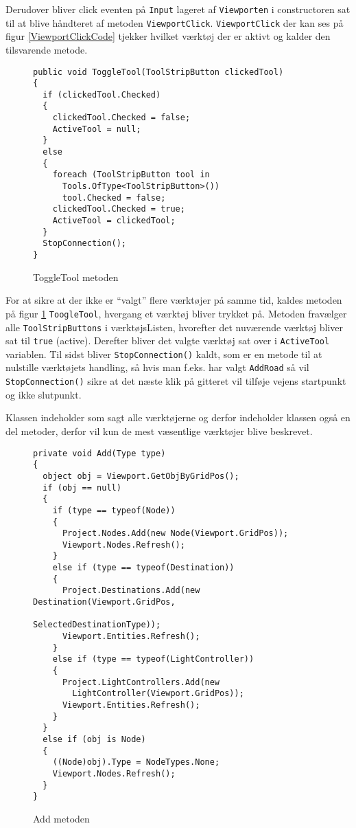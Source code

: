 Derudover bliver click eventen på \texttt{Input} lageret af \texttt{Viewporten} i constructoren sat til at blive håndteret af metoden \texttt{ViewportClick}. \texttt{ViewportClick} der kan ses på figur \ref{ViewportClickCode} tjekker hvilket værktøj der er aktivt og kalder den tilsvarende metode.

\begin{figure}[H]
\begin{lstlisting}
public void ToggleTool(ToolStripButton clickedTool)
{
  if (clickedTool.Checked)
  {
    clickedTool.Checked = false;
    ActiveTool = null;
  }
  else
  {
    foreach (ToolStripButton tool in 
      Tools.OfType<ToolStripButton>())
      tool.Checked = false;
    clickedTool.Checked = true;
    ActiveTool = clickedTool;
  }
  StopConnection();
}
\end{lstlisting}
\caption{ToggleTool metoden}\label{ToggleToolCode}
\end{figure}

For at sikre at der ikke er “valgt” flere værktøjer på samme tid, kaldes metoden på figur \ref{ToggleToolCode} \texttt{ToogleTool}, hvergang et værktøj bliver trykket på. Metoden fravælger alle \texttt{ToolStripButtons} i værktøjsListen, hvorefter det nuværende værktøj bliver sat til \texttt{true} (active). Derefter bliver det valgte værktøj sat over i \texttt{ActiveTool} variablen. Til sidst bliver \texttt{StopConnection()} kaldt, som er en metode til at nulstille værktøjets handling, så hvis man f.eks. har valgt \texttt{AddRoad} så vil \texttt{StopConnection()} sikre at det næste klik på gitteret vil tilføje vejens startpunkt og ikke slutpunkt.

\vspace{5mm}

Klassen indeholder som sagt alle værktøjerne og derfor indeholder klassen også en del metoder, derfor vil kun de mest væsentlige værktøjer blive beskrevet.

\begin{figure}[H]
\begin{lstlisting}
private void Add(Type type)
{
  object obj = Viewport.GetObjByGridPos();
  if (obj == null)
  {
    if (type == typeof(Node))
    {
      Project.Nodes.Add(new Node(Viewport.GridPos));
      Viewport.Nodes.Refresh();
    }
    else if (type == typeof(Destination))
    {
      Project.Destinations.Add(new Destination(Viewport.GridPos,  
                                   SelectedDestinationType));
      Viewport.Entities.Refresh();
    }
    else if (type == typeof(LightController))
    {
      Project.LightControllers.Add(new 
        LightController(Viewport.GridPos));
      Viewport.Entities.Refresh();
    }
  }
  else if (obj is Node)
  {
    ((Node)obj).Type = NodeTypes.None;
    Viewport.Nodes.Refresh();
  }
}
\end{lstlisting}
\caption{Add metoden}\label{AddCode}
\end{figure}


